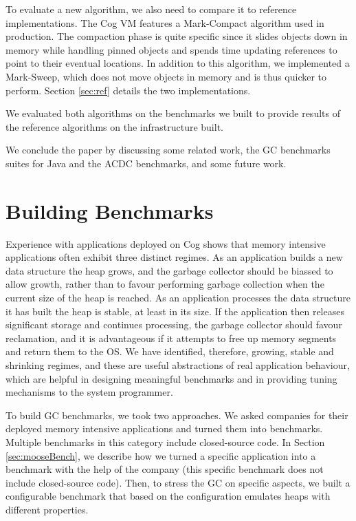 \documentclass[10pt, sigplan]{acmart}
\begin{document}
To evaluate a new algorithm, we also need to compare it to reference implementations. The Cog VM features a Mark-Compact algorithm used in production. The compaction phase is quite specific since it slides objects down in memory while handling pinned objects and spends time updating references to point to their eventual locations. In addition to this algorithm, we implemented a Mark-Sweep, which does not move objects in memory and is thus quicker to perform. Section \ref{sec:ref} details the two implementations.

We evaluated both algorithms on the benchmarks we built to provide results of the reference algorithms on the infrastructure built.

We conclude the paper by discussing some related work, the GC benchmarks suites for Java and the ACDC benchmarks, and some future work.

\section{Building Benchmarks} \label{sec:bench}
Experience with applications deployed on Cog shows that memory intensive applications often exhibit three distinct regimes.  As an application builds a new data structure the heap grows, and the garbage collector should be biassed to allow growth, rather than to favour performing garbage collection when the current size of the heap is reached.  As an application processes the data structure it has built the heap is stable, at least in its size.  If the application then releases significant storage and continues processing, the garbage collector should favour reclamation, and it is advantageous if it attempts to free up memory segments and return them to the OS.  We have identified, therefore, growing, stable and shrinking regimes, and these are useful abstractions of real application behaviour, which are helpful in designing meaningful benchmarks and in providing tuning mechanisms to the system programmer.

To build GC benchmarks, we took two approaches. We asked companies for their deployed memory intensive applications and turned them into benchmarks. Multiple benchmarks in this category include closed-source code. In Section \ref{sec:mooseBench}, we describe how we turned a specific application into a benchmark with the help of the company (this specific benchmark does not include closed-source code). Then, to stress the GC on specific aspects, we built a configurable benchmark that based on the configuration emulates heaps with different properties. 
\end{document}
